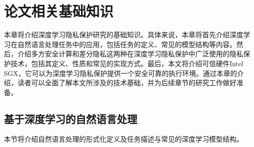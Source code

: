 
\chapter{论文相关基础知识}


本章将介绍深度学习隐私保护研究的基础知识。具体来说，本章将首先介绍深度学习在自然语言处理任务中的应用，包括任务的定义、常见的模型结构等内容。然后，介绍多方安全计算和差分隐私这两种在深度学习隐私保护中广泛使用的隐私保护技术，包括其定义、性质和常见的实现方式。最后，本文将介绍可信硬件Intel SGX，它可以为深度学习隐私保护提供一个安全可靠的执行环境。通过本章的介绍，读者可以全面了解本文所涉及的技术基础，并为后续章节的研究工作做好准备。

\section{基于深度学习的自然语言处理}

本节将介绍自然语言处理的形式化定义及任务描述与常见的深度学习模型结构。

